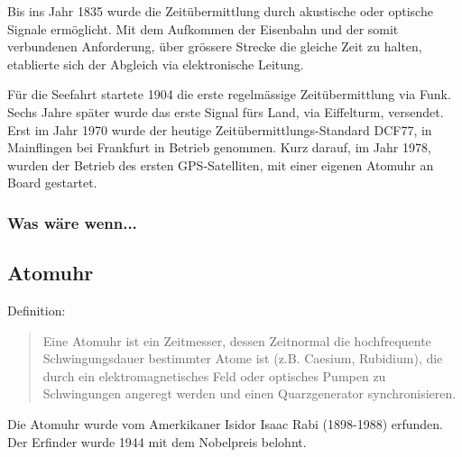 Bis ins Jahr 1835 wurde die Zeitübermittlung durch akustische oder optische Signale ermöglicht.
Mit dem Aufkommen der Eisenbahn und der somit verbundenen Anforderung, über grössere Strecke die gleiche Zeit zu halten, etablierte sich der Abgleich via elektronische Leitung.

Für die Seefahrt startete 1904 die erste regelmässige Zeitübermittlung via Funk. Sechs Jahre später wurde das erste Signal fürs Land, via Eiffelturm, versendet.
Erst im Jahr 1970 wurde der heutige Zeitübermittlungs-Standard DCF77, in Mainflingen bei Frankfurt in Betrieb genommen.
Kurz darauf, im Jahr 1978, wurden der Betrieb des ersten GPS-Satelliten, mit einer eigenen Atomuhr an Board gestartet.


\subsubsection{Was wäre wenn...}


\subsection{Atomuhr}
Definition:
\begin{quote}
Eine Atomuhr ist ein Zeitmesser, dessen Zeitnormal die hochfrequente Schwingungsdauer bestimmter Atome ist (z.B. Caesium, Rubidium), die durch ein elektromagnetisches Feld oder optisches Pumpen zu Schwingungen angeregt werden und einen Quarzgenerator synchronisieren.
\end{quote} %
Die Atomuhr wurde vom Amerkikaner Isidor Isaac Rabi (1898-1988) erfunden. Der Erfinder wurde 1944 mit dem Nobelpreis belohnt.

